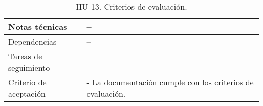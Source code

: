 \begin{table}[H]
\begin{adjustbox}{max width=\textwidth}
\begin{tabularx}{\textwidth}{l|L}
        Notas técnicas & – \\ \hline
        Dependencias & – \\ \hline
        Tareas de seguimiento & – \\ \hline
        Criterio de aceptación & - La documentación cumple con los criterios de evaluación. \\ \hline
    \end{tabularx}
    \end{adjustbox}
    \caption{HU-13. Criterios de evaluación.}
\end{table}
